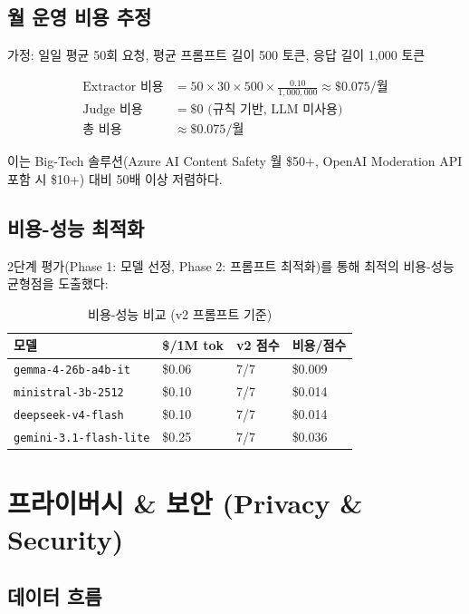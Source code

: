 \documentclass[11pt,a4paper]{article}
\begin{document}
\subsection{월 운영 비용 추정}

가정: 일일 평균 50회 요청, 평균 프롬프트 길이 500 토큰, 응답 길이 1,000 토큰

\begin{align*}
\text{Extractor 비용} &= 50 \times 30 \times 500 \times \frac{0.10}{1{,}000{,}000} \approx \$0.075/\text{월} \\
\text{Judge 비용} &= \$0 \text{ (규칙 기반, LLM 미사용)} \\
\text{총 비용} &\approx \$0.075/\text{월}
\end{align*}

이는 Big-Tech 솔루션(Azure AI Content Safety 월 \$50+, OpenAI Moderation API 포함 시 \$10+) 대비 50배 이상 저렴하다.

\subsection{비용-성능 최적화}

2단계 평가(Phase 1: 모델 선정, Phase 2: 프롬프트 최적화)를 통해 최적의 비용-성능 균형점을 도출했다:

\begin{table}[h]
\centering
\begin{tabular}{@{}llll@{}}
\toprule
모델 & \$/1M tok & v2 점수 & 비용/점수 \\
\midrule
\texttt{gemma-4-26b-a4b-it} & \$0.06 & 7/7 & \$0.009 \\
\texttt{ministral-3b-2512} & \$0.10 & 7/7 & \$0.014 \\
\texttt{deepseek-v4-flash} & \$0.10 & 7/7 & \$0.014 \\
\texttt{gemini-3.1-flash-lite} & \$0.25 & 7/7 & \$0.036 \\
\bottomrule
\end{tabular}
\caption{비용-성능 비교 (v2 프롬프트 기준)}
\end{table}

\section{프라이버시 \& 보안 (Privacy \& Security)}

\subsection{데이터 흐름}
\end{document}
